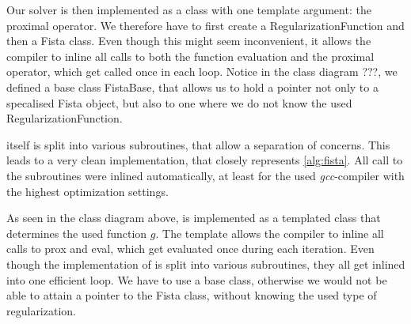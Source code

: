 Our solver \fista is then implemented as a class with one template argument: the
proximal operator.
We therefore have to first create a RegularizationFunction and then a Fista
class.
Even though this might seem inconvenient, it allows the compiler to inline all
calls to both the function evaluation and the proximal operator, which get
called once in each loop.
Notice in the class diagram ???, we defined a base class FistaBase, that allows us to hold a pointer not only to a specalised Fista object, but also to one where we do not know the used RegularizationFunction.

\fista itself is split into various subroutines, that allow a separation of
concerns.
This leads to a very clean implementation, that closely represents
\cref{alg:fista}.
All call to the subroutines were inlined automatically, at least for the used
\emph{gcc}-compiler with the highest optimization settings.


As seen in the class diagram above, \fista is implemented as a templated class
that determines the used function \(g\).
The template allows the compiler to inline all calls to prox and eval, which get
evaluated once during each iteration.
Even though the implementation of \fista is split into various subroutines, they
all get inlined into one efficient loop.
We have to use a base class, otherwise we would not be able to attain a pointer
to the Fista class, without knowing the used type of regularization.
\FloatBarrier{}
